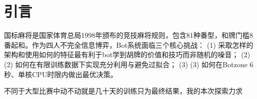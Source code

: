\documentclass{article}
\begin{document}

\printAffiliationsAndNotice{}

\begin{abstract}
国标麻将是具有$10^{48}$状态空间、235维离散动作空间的不完全信息四人博弈。

笔者将通过自己对架构、特征工程、数据增强、以及数据增强后因效率低下而进行的预处理优化的探索实验和分析，来展示自己的思考和创新性，和自己的想法对于麻将bot设计的意义。受限于期末周时间紧迫和资金算力不足，笔者探索的大多架构大多是实验性的（而非疯狂调参竞赛性的），重点训了个别时间预算合适的架构，然而不少因为超参调节缺乏时间原因而失败。经历长时间探索，最终得出几个较有前景的架构思想，以及几个能够botzone实战不错的完整bot，详见下解。
\end{abstract}

\section{引言}

国标麻将是国家体育总局1998年颁布的竞技麻将规则，包含81种番型，和牌门槛8番起和。作为四人不完全信息博弈，Bot系统面临三个核心挑战：
(1) 采取怎样的架构和使用如何的特征最有利于bot学到胡牌的价值和技巧而非随机的噪音；
(2) (2) 如何在有限训练数据下实现充分利用与避免过拟合；
(3) (3) 如何在Botzone 6秒、单核CPU时限内做出最优决策。

不同于大型比赛中动不动就是几十天的训练只为最终结果，我的本次探索力求
\end{document}
